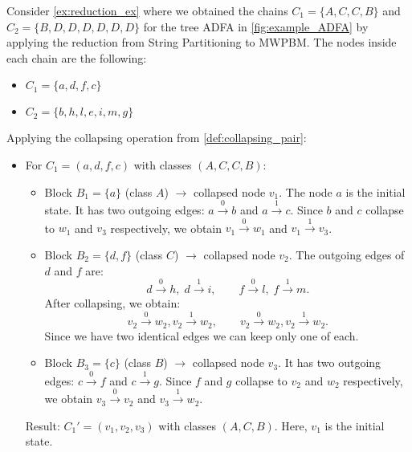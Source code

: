 \begin{example}
    Consider \cref{ex:reduction_ex} where we obtained the chains $C_1 = \{A,C,C,B\}$ and $C_2 = \{B,D,D,D,D,D,D\}$ for the tree ADFA in \cref{fig:example_ADFA} by applying the reduction from String Partitioning to MWPBM. The nodes inside each chain are the following:
    \begin{itemize}
        \item $C_1 = \{a,d,f,c\}$
        \item $C_2 = \{b,h,l,e,i,m,g\}$
    \end{itemize}
    
    Applying the collapsing operation from \cref{def:collapsing_pair}:
    \begin{itemize}
        \item For $C_1 = (a,d,f,c)$ with classes $(A,C,C,B)$: 
        \begin{itemize}
            \item Block $B_1 = \{a\}$ (class $A$) $\rightarrow$ collapsed node $v_1$. The node $a$ is the initial state. It has two outgoing edges: $a \xrightarrow{0} b$ and $a \xrightarrow{1} c$. Since $b$ and $c$ collapse to $w_1$ and $v_3$ respectively, we obtain $v_1 \xrightarrow{0} w_1$ and $v_1 \xrightarrow{1} v_3$.
            \item Block $B_2 = \{d,f\}$ (class $C$) $\rightarrow$ collapsed node $v_2$. The outgoing edges of $d$ and $f$ are:
            \[
                d \xrightarrow{0} h,\; d \xrightarrow{1} i,\qquad
                f \xrightarrow{0} l,\; f \xrightarrow{1} m.
            \]
            After collapsing, we obtain:
            \[
                v_2 \xrightarrow{0} w_2, v_2 \xrightarrow{1} w_2,\qquad v_2 \xrightarrow{0} w_2, v_2 \xrightarrow{1} w_2.
            \]
            Since we have two identical edges we can keep only one of each.
            \item Block $B_3 = \{c\}$ (class $B$) $\rightarrow$ collapsed node $v_3$. It has two outgoing edges: $c \xrightarrow{0} f$ and $c \xrightarrow{1} g$. Since $f$ and $g$ collapse to $v_2$ and $w_2$ respectively, we obtain $v_3 \xrightarrow{0} v_2$ and $v_3 \xrightarrow{1} w_2$.
        \end{itemize}
        Result: $C_1' = (v_1, v_2, v_3)$ with classes $(A, C, B)$. Here, $v_1$ is the initial state.
        

\end{itemize}
\end{example}
